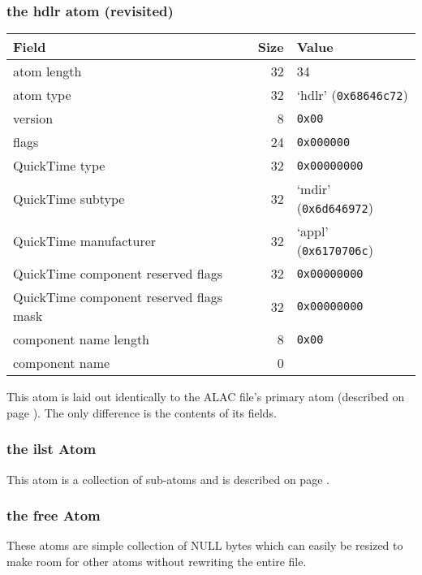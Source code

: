 \subsubsection{the hdlr atom (revisited)}

\begin{tabular}{|l|r|l|}
\hline
Field & Size & Value \\
\hline
atom length & 32 & 34 \\
atom type & 32 & `hdlr' (\texttt{0x68646c72}) \\
\hline
version & 8 & \texttt{0x00} \\
flags & 24 & \texttt{0x000000} \\
QuickTime type & 32 & \texttt{0x00000000} \\
QuickTime subtype & 32 & `mdir' (\texttt{0x6d646972}) \\
QuickTime manufacturer & 32 & `appl' (\texttt{0x6170706c}) \\
QuickTime component reserved flags & 32 & \texttt{0x00000000} \\
QuickTime component reserved flags mask & 32 & \texttt{0x00000000} \\
component name length & 8 & \texttt{0x00} \\
component name & 0 & \\
\hline
\end{tabular}

This atom is laid out identically to the ALAC file's primary
 atom (described on page \pageref{alac_hdlr}).
The only difference is the contents of its fields.

\subsubsection{the ilst Atom}

This atom is a collection of  sub-atoms
and is described on page \pageref{m4a_meta}.

\subsubsection{the free Atom}

These atoms are simple collection of NULL bytes which can easily be
resized to make room for other atoms without rewriting the entire file.
